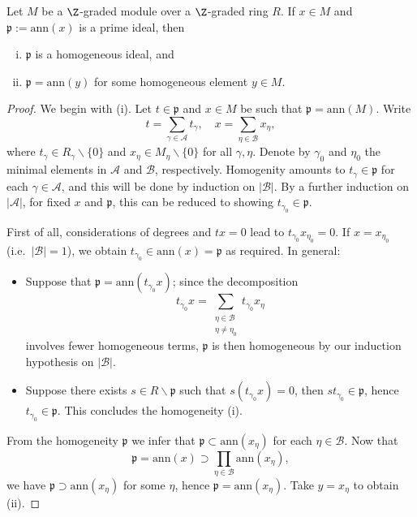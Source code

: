 \begin{lemma}
	Let $M$ be a $\Z$-graded module over a $\Z$-graded ring $R$. If $x \in M$ and $\mathfrak{p} := \mathrm{ann}(x)$ is a prime ideal, then
	\begin{enumerate}[(i)]
		\item $\mathfrak{p}$ is a homogeneous ideal, and
		\item $\mathfrak{p} = \mathrm{ann}(y)$ for some homogeneous element $y \in M$.
	\end{enumerate}
\end{lemma}
\begin{proof}
	We begin with (i). Let $t \in \mathfrak{p}$ and $x \in M$ be such that $\mathfrak{p} = \text{ann}(M)$. Write
	\[ t = \sum_{\gamma \in \mathcal{A}} t_\gamma, \quad x = \sum_{\eta \in \mathcal{B}} x_\eta, \]
	where $t_\gamma \in R_\gamma \smallsetminus \{0\}$ and $x_\eta \in M_\eta \smallsetminus \{0\}$ for all $\gamma, \eta$. Denote by $\gamma_0$ and $\eta_0$ the minimal elements in $\mathcal{A}$ and $\mathcal{B}$, respectively. Homogenity amounts to $t_\gamma \in \mathfrak{p}$ for each $\gamma \in \mathcal{A}$, and this will be done by induction on $|\mathcal{B}|$. By a further induction on $|\mathcal{A}|$, for fixed $x$ and $\mathfrak{p}$, this can be reduced to showing $t_{\gamma_0} \in \mathfrak{p}$.
	
	First of all, considerations of degrees and $tx=0$ lead to $t_{\gamma_0} x_{\eta_0} = 0$. If $x = x_{\eta_0}$ (i.e.\ $|\mathcal{B}| = 1$), we obtain $t_{\gamma_0} \in \text{ann}(x) = \mathfrak{p}$ as required. In general:
	\begin{itemize}
		\item Suppose that $\mathfrak{p} = \text{ann}(t_{\gamma_0} x)$; since the decomposition
		\[ t_{\gamma_0} x = \sum_{\substack{\eta \in \mathcal{B} \\ \eta \neq \eta_0}} t_{\gamma_0} x_\eta \]
		involves fewer homogeneous terms, $\mathfrak{p}$ is then homogeneous by our induction hypothesis on $|\mathcal{B}|$.
		\item Suppose there exists $s \in R \smallsetminus \mathfrak{p}$ such that $s(t_{\gamma_0} x) = 0$, then $st_{\gamma_0} \in \mathfrak{p}$, hence $t_{\gamma_0} \in \mathfrak{p}$. This concludes the homogeneity (i).
	\end{itemize}
	
	From the homogeneity $\mathfrak{p}$ we infer that $\mathfrak{p} \subset \text{ann}(x_\eta)$ for each $\eta \in \mathcal{B}$. Now that
	\[ \mathfrak{p} = \text{ann}(x) \supset \prod_{\eta \in \mathcal{B}} \text{ann}(x_\eta), \]
	we have $\mathfrak{p} \supset \text{ann}(x_\eta)$ for some $\eta$, hence $\mathfrak{p} = \text{ann}(x_\eta)$. Take $y = x_\eta$ to obtain (ii).
\end{proof}

